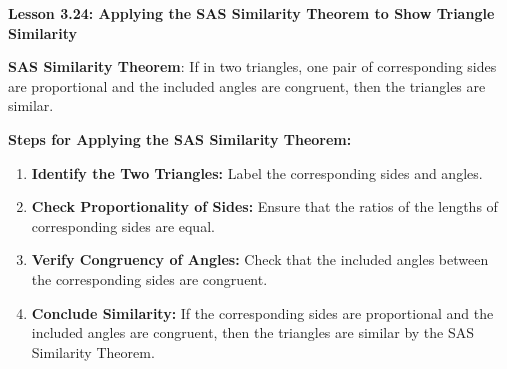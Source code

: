 \begin{center}
\textbf{Lesson 3.24: Applying the SAS Similarity Theorem to Show Triangle Similarity}
\end{center}

\vspace*{-1.5ex}

\noindent\textbf{SAS Similarity Theorem}: If in two triangles, one pair of corresponding sides are proportional and the included angles are congruent, then the triangles are similar.

\noindent \textbf{Steps for Applying the SAS Similarity Theorem:}
\begin{enumerate}[noitemsep, label = \color{blue}\arabic*. ]
    \item \textbf{Identify the Two Triangles:} Label the corresponding sides and angles.
    \item \textbf{Check Proportionality of Sides:} Ensure that the ratios of the lengths of corresponding sides are equal.
    \item \textbf{Verify Congruency of Angles:} Check that the included angles between the corresponding sides are congruent.
    \item \textbf{Conclude Similarity:} If the corresponding sides are proportional and the included angles are congruent, then the triangles are similar by the SAS Similarity Theorem.
\end{enumerate}
